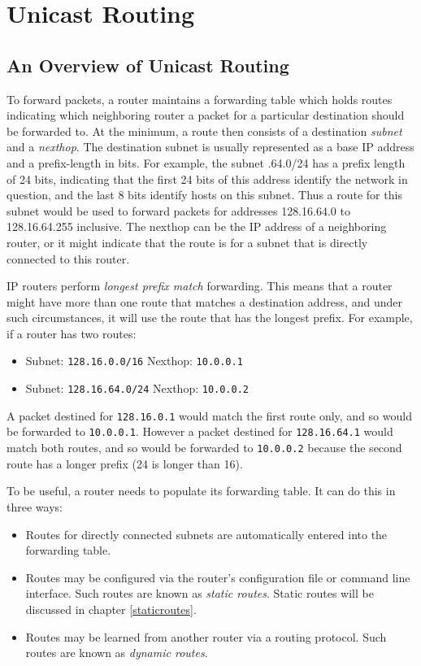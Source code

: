 \chapter{Unicast Routing}

\section{An Overview of Unicast Routing}

To forward packets, a router maintains a forwarding table which holds
routes indicating which neighboring router a packet for a particular
destination should be forwarded to.  At the minimum, a route then
consists of a destination {\it subnet} and a {\it nexthop}.  The destination
subnet is usually represented as a base IP address and a prefix-length
in bits.  For example, the subnet {.64.0/24} has a prefix
length of 24 bits, indicating that the first 24 bits of this address
identify the network in question, and the last 8 bits identify hosts
on this subnet.  Thus a route for this subnet would be used to forward
packets for addresses 128.16.64.0 to 128.16.64.255 inclusive.  The
nexthop can be the IP address of a neighboring router, or it might
indicate that the route is for a subnet that is directly connected to
this router.

IP routers perform {\it longest prefix match} forwarding.  This means
that a router might have more than one route that matches a
destination address, and under such circumstances, it will use the
route that has the longest prefix.   For example, if a router has two routes:
\begin{itemize}
\item Subnet: {\tt 128.16.0.0/16} Nexthop: {\tt 10.0.0.1}
\item Subnet: {\tt 128.16.64.0/24} Nexthop: {\tt 10.0.0.2}
\end{itemize}
\noindent A packet destined for {\tt 128.16.0.1} would match the first
route only, and so would be forwarded to {\tt 10.0.0.1}.  However a
packet destined for {\tt 128.16.64.1} would match both routes, and so
would be forwarded to {\tt 10.0.0.2} because the second route has a
longer prefix (24 is longer than 16).

To be useful, a router needs to populate its forwarding table.  It can
do this in three ways:
\begin{itemize}
\item Routes for directly connected subnets are automatically entered into
the forwarding table.
\item Routes may be configured via the router's configuration file or
command line interface.  Such routes are known as {\it static
routes}. Static routes will be discussed in chapter \ref{staticroutes}.
\item Routes may be learned from another router via a routing
protocol.  Such routes are known as {\it dynamic routes}.
\end{itemize}

